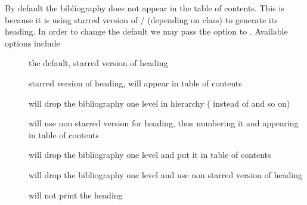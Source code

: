 
By default the bibliography does not appear in the table of contents. This is
because it is using starred version of \slash{}
(depending on class) to generate its heading. In order to change the default we
may pass the option  to . Available
options include
\begin{description}
  \item[] the default, starred version of heading
  \item[] starred version of heading, will appear in table of contents
  \item[] will drop the bibliography one level in
  hierarchy ( instead of  and so on)
  \item[] will use non starred version for heading, thus
  numbering it and appearing in table of contents
  \item[] will drop the bibliography one level and put it in
  table of contents
  \item[] will drop the bibliography one level and use
  non starred version of heading
  \item[] will not print the heading
\end{description}

